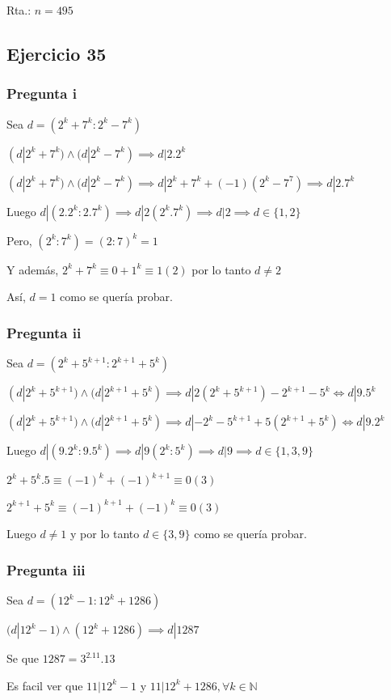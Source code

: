 Rta.: $ n = 495 $

\subsection{Ejercicio 35}
\subsubsection{Pregunta i}

Sea $ d = (2^k+7^k:2^k-7^k) $

$ (d|2^k + 7^k) \wedge (d|2^k-7^k) \implies d|2.2^k $ 

$ (d|2^k + 7^k) \wedge (d|2^k-7^k) \implies d|2^k+7^k+(-1)(2^k-7^7) \implies d|2.7^k $

Luego $ d|(2.2^k:2.7^k) \implies d|2(2^k.7^k) \implies d|2 \implies d \in \{ 1,2 \}$

Pero, $ (2^k:7^k) = (2:7)^k = 1$

Y además, $ 2^k+7^k \equiv 0 + 1^k \equiv 1(2)$ por lo tanto $ d\neq 2 $

Así, $ d = 1 $ como se quería probar.

\subsubsection{Pregunta ii}
Sea $ d = (2^k+5^{k+1}: 2^{k+1} + 5^k) $

$ (d|2^k + 5^{k+1}) \wedge (d|2^{k+1} + 5^k) \implies d|2(2^k + 5^{k+1}) - 2^{k+1} - 5^k \iff d|9.5^k$

$ (d|2^k + 5^{k+1}) \wedge (d|2^{k+1} + 5^k) \implies d|-2^k - 5^{k+1} + 5(2^{k+1} + 5^k) \iff d|9.2^k$

Luego $ d|(9.2^k:9.5^k) \implies d|9(2^k:5^k) \implies d|9 \implies d \in \{ 1,3,9 \}$

$ 2^k+5^k.5 \equiv (-1)^k + (-1)^{k+1} \equiv 0 (3)$

$ 2^{k+1} + 5^k \equiv (-1)^{k+1} + (-1)^{k} \equiv 0 (3)$

Luego $ d \neq 1 $ y por lo tanto $ d \in \{ 3, 9 \} $ como se quería probar.

\subsubsection{Pregunta iii}
Sea $ d = (12^k-1:12^k+1286) $

$ (d|12^k-1) \wedge (12^k + 1286) \implies d|1287 $

Se que $ 1287 = 3^2.11.13 $

Es facil ver que $ 11|12^k-1 $ y $ 11|12^k+1286 , \forall k \in \mathbb{N} $

